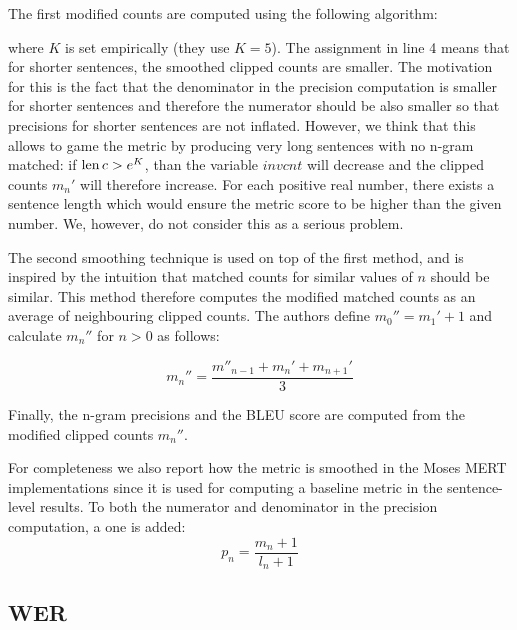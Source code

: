 The first modified counts are computed using the following algorithm:
\begin{algorithmic}[1]    
     \Else {} \EndIf \EndFor
\end{algorithmic} where $K$ is set empirically (they use $K = 5$). The
assignment in line 4 means that for shorter sentences, the smoothed clipped
counts are smaller. The motivation for this is the fact that the denominator in
the precision computation is smaller for shorter sentences and therefore the
numerator should be also smaller so that precisions for shorter sentences are
not inflated. However, we think that this allows to game the metric by
producing very long sentences with no n-gram matched: if $\operatorname{len}{c} > e^K$, than
the variable $invcnt$ will decrease and the clipped counts $m_n'$ will
therefore increase. For each positive real number, there exists a sentence
length which would ensure the metric score to be higher than the given number.
We, however, do not consider this as a serious problem.

The second smoothing technique is used on top of the first method, and is inspired by
the intuition that matched counts for similar values of $n$ should be similar.
This method therefore computes the modified matched counts as an average of
neighbouring clipped counts. The authors define $m_0'' = m_1' + 1$ and
calculate $m_n''$ for $n > 0$ as follows:

\begin{equation*}
    m_n'' = \frac{
        m''_{n-1} + m_n' + m_{n+1}'
    }{
        3
    }
\end{equation*}

Finally, the n-gram precisions and the BLEU score are computed from the modified
clipped counts $m_n''$.

For completeness we also report how the  metric is smoothed in
the Moses MERT implementations since it is used for computing a baseline metric
 in the sentence-level results. To both the numerator and denominator
in the precision computation, a one is added:
\begin{equation*}
    p_n = \frac{
        m_n + 1
    }{
        l_n + 1
    }
\end{equation*}

\subsection{WER}

